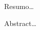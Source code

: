 \resumo
Resumo\ldots
\begin{keywords}
\end{keywords}

\abstract
Abstract\ldots
\begin{keywords}
\end{keywords}

